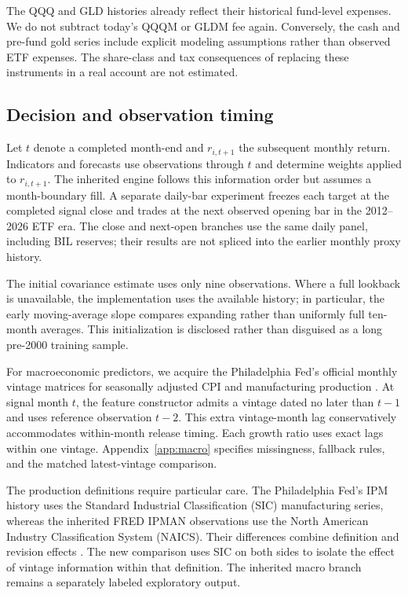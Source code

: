 \documentclass[12pt,letterpaper]{article}
\begin{document}
The QQQ and GLD histories already reflect their historical fund-level expenses. We do not subtract today's QQQM or GLDM fee again. Conversely, the cash and pre-fund gold series include explicit modeling assumptions rather than observed ETF expenses. The share-class and tax consequences of replacing these instruments in a real account are not estimated.

\subsection{Decision and observation timing}
Let $t$ denote a completed month-end and $r_{i,t+1}$ the subsequent monthly return. Indicators and forecasts use observations through $t$ and determine weights applied to $r_{i,t+1}$. The inherited engine follows this information order but assumes a month-boundary fill. A separate daily-bar experiment freezes each target at the completed signal close and trades at the next observed opening bar in the 2012--2026 ETF era. The close and next-open branches use the same daily panel, including BIL reserves; their results are not spliced into the earlier monthly proxy history.

The initial covariance estimate uses only nine observations. Where a full lookback is unavailable, the implementation uses the available history; in particular, the early moving-average slope compares expanding rather than uniformly full ten-month averages. This initialization is disclosed rather than disguised as a long pre-2000 training sample.

For macroeconomic predictors, we acquire the Philadelphia Fed's official monthly vintage matrices for seasonally adjusted CPI and manufacturing production \citep{phillypcpi2026,phillyipm2026}. At signal month $t$, the feature constructor admits a vintage dated no later than $t-1$ and uses reference observation $t-2$. This extra vintage-month lag conservatively accommodates within-month release timing. Each growth ratio uses exact lags within one vintage. Appendix~\ref{app:macro} specifies missingness, fallback rules, and the matched latest-vintage comparison.

The production definitions require particular care. The Philadelphia Fed's IPM history uses the Standard Industrial Classification (SIC) manufacturing series, whereas the inherited FRED IPMAN observations use the North American Industry Classification System (NAICS). Their differences combine definition and revision effects \citep{phillyipmdoc,fredipman}. The new comparison uses SIC on both sides to isolate the effect of vintage information within that definition. The inherited macro branch remains a separately labeled exploratory output.
\end{document}
